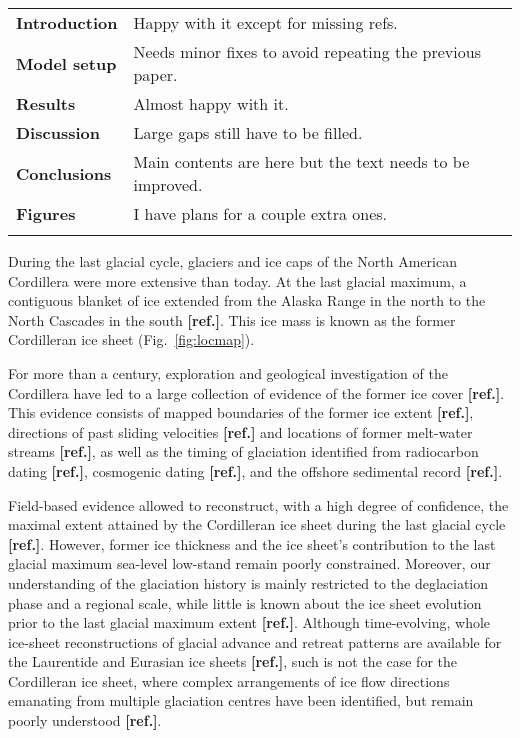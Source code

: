 \documentclass[tc, ms]{copernicus}
\newcommand{\aref}[0]{\textbf{[ref.]}}
\begin{document}
\begin{center}
\begin{tabular}{>{\bfseries}ll}
    \tophline
    Introduction & Happy with it except for missing refs.\\
    Model setup  & Needs minor fixes to avoid repeating the previous paper.\\
    Results      & Almost happy with it. \\
    Discussion   & Large gaps still have to be filled.\\
    Conclusions  & Main contents are here but the text needs to be improved.\\
    Figures      & I have plans for a couple extra ones.\\
    \bottomhline
\end{tabular}
\end{center}

\introduction
\label{sec:intro}

During the last glacial cycle, glaciers and ice caps of the North American
Cordillera were more extensive than today. At the last glacial maximum, a
contiguous blanket of ice extended from the Alaska Range in the north to the
North Cascades in the south \aref. This ice mass is known as the former
Cordilleran ice sheet (Fig.~\ref{fig:locmap}).

For more than a century, exploration and geological investigation of the
Cordillera have led to a large collection of evidence of the former ice cover
\aref. This evidence consists of mapped boundaries of the former ice extent
\aref, directions of past sliding velocities {\aref} and locations of former
melt-water streams \aref, as well as the timing of glaciation identified from
radiocarbon dating \aref, cosmogenic dating \aref, and the offshore sedimental
record \aref.

Field-based evidence allowed to reconstruct, with a high degree of confidence,
the maximal extent attained by the Cordilleran ice sheet during the last glacial
cycle \aref. However, former ice thickness and the ice sheet's contribution to the
last glacial maximum sea-level low-stand remain poorly constrained. Moreover,
our understanding of the glaciation history is mainly restricted to the
deglaciation phase and a regional scale, while little is known about the ice
sheet evolution prior to the last glacial maximum extent \aref. Although
time-evolving, whole ice-sheet reconstructions of glacial advance and retreat
patterns are available for the Laurentide and Eurasian ice sheets \aref, such is not
the case for the Cordilleran ice sheet, where complex arrangements of ice flow
directions emanating from multiple glaciation centres have been identified, but
remain poorly understood \aref.
\end{document}
